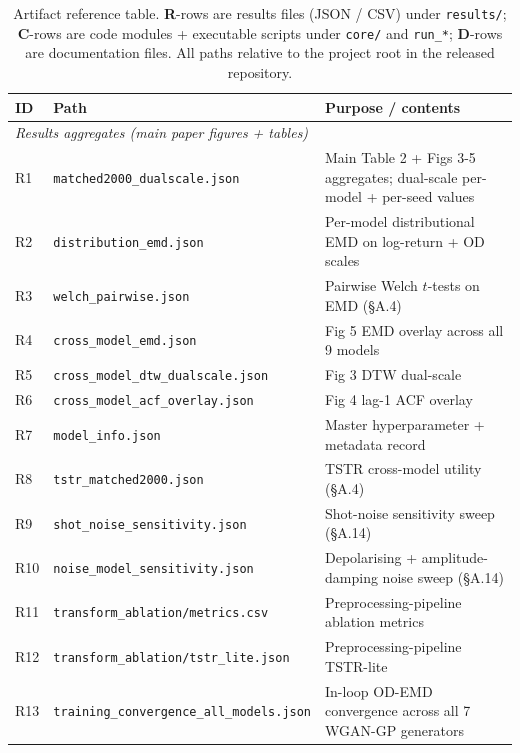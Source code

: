 \begin{table}[!htbp]
\centering
\caption{Artifact reference table. \textbf{R}-rows are results files
(JSON / CSV) under \texttt{results/}; \textbf{C}-rows are code
modules + executable scripts under \texttt{core/} and \texttt{run\_*}; \textbf{D}-rows
are documentation files. All paths relative to the project root in the
released repository.}
\label{tbl:artifact_pointers}
\scriptsize
\setlength{\tabcolsep}{4pt}
\renewcommand{\arraystretch}{1.0}
\begin{tabular}{@{}llp{6.0cm}@{}}
\toprule
\textbf{ID} & \textbf{Path} & \textbf{Purpose / contents} \\
\midrule
\multicolumn{3}{l}{\textit{Results aggregates (main paper figures + tables)}} \\
\midrule
R1  & \texttt{matched2000\_dualscale.json}            & Main Table 2 + Figs 3-5 aggregates; dual-scale per-model + per-seed values \\
R2  & \texttt{distribution\_emd.json}                 & Per-model distributional EMD on log-return + OD scales \\
R3  & \texttt{welch\_pairwise.json}                   & Pairwise Welch $t$-tests on EMD (\S A.4) \\
R4  & \texttt{cross\_model\_emd.json}                 & Fig 5 EMD overlay across all 9 models \\
R5  & \texttt{cross\_model\_dtw\_dualscale.json}      & Fig 3 DTW dual-scale \\
R6  & \texttt{cross\_model\_acf\_overlay.json}        & Fig 4 lag-1 ACF overlay \\
R7  & \texttt{model\_info.json}                       & Master hyperparameter + metadata record \\
R8  & \texttt{tstr\_matched2000.json}                 & TSTR cross-model utility (\S A.4) \\
R9  & \texttt{shot\_noise\_sensitivity.json}          & Shot-noise sensitivity sweep (\S A.14) \\
R10 & \texttt{noise\_model\_sensitivity.json}         & Depolarising + amplitude-damping noise sweep (\S A.14) \\
R11 & \texttt{transform\_ablation/metrics.csv}        & Preprocessing-pipeline ablation metrics \\
R12 & \texttt{transform\_ablation/tstr\_lite.json}    & Preprocessing-pipeline TSTR-lite \\
R13 & \texttt{training\_convergence\_all\_models.json} & In-loop OD-EMD convergence across all 7 WGAN-GP generators \\

\end{tabular}
\end{table}
